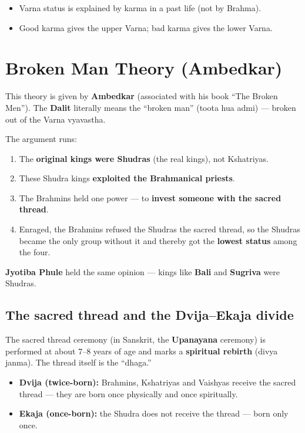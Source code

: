 \begin{QuickRevision}
\begin{itemize}
\item Varna status is explained by karma in a past life (not by Brahma).
\item Good karma gives the upper Varna; bad karma gives the lower Varna.
\end{itemize}
\end{QuickRevision}

\section{Broken Man Theory (Ambedkar)}

This theory is given by \textbf{Ambedkar} (associated with his book ``The Broken Men''). The \textbf{Dalit} literally means the ``broken man'' (toota hua admi) --- broken out of the Varna vyavastha.

The argument runs:
\begin{enumerate}
\item The \textbf{original kings were Shudras} (the real kings), not Kshatriyas.
\item These Shudra kings \textbf{exploited the Brahmanical priests}.
\item The Brahmins held one power --- to \textbf{invest someone with the sacred thread}.
\item Enraged, the Brahmins refused the Shudras the sacred thread, so the Shudras became the only group without it and thereby got the \textbf{lowest status} among the four.
\end{enumerate}

\begin{ExampleBox}
\textbf{Jyotiba Phule} held the same opinion --- kings like \textbf{Bali} and \textbf{Sugriva} were Shudras.
\end{ExampleBox}

\subsection{The sacred thread and the Dvija--Ekaja divide}

The sacred thread ceremony (in Sanskrit, the \textbf{Upanayana} ceremony) is performed at about 7--8 years of age and marks a \textbf{spiritual rebirth} (divya janma). The thread itself is the ``dhaga.''

\begin{KeyConcept}
\begin{itemize}
\item \textbf{Dvija (twice-born):} Brahmins, Kshatriyas and Vaishyas receive the sacred thread --- they are born once physically and once spiritually.
\item \textbf{Ekaja (once-born):} the Shudra does not receive the thread --- born only once.
\end{itemize}
\end{KeyConcept}

